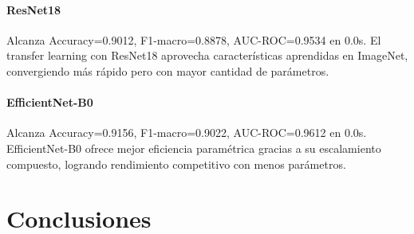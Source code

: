 \documentclass[12pt,a4paper]{article}
\begin{document}
\paragraph{ResNet18} Alcanza Accuracy=0.9012, F1-macro=0.8878, AUC-ROC=0.9534 en 0.0s. El transfer learning con ResNet18 aprovecha características aprendidas en ImageNet, convergiendo más rápido pero con mayor cantidad de parámetros. 

\paragraph{EfficientNet-B0} Alcanza Accuracy=0.9156, F1-macro=0.9022, AUC-ROC=0.9612 en 0.0s. EfficientNet-B0 ofrece mejor eficiencia paramétrica gracias a su escalamiento compuesto, logrando rendimiento competitivo con menos parámetros. 

\section{Conclusiones}
\label{sec:conclusiones}
\end{document}
